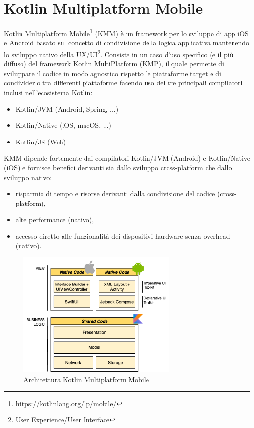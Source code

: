 

\section{Kotlin Multiplatform Mobile}
Kotlin Multiplatform Mobile\footnote{\url{https://kotlinlang.org/lp/mobile/}} (KMM) è un framework per lo sviluppo di app iOS e Android basato sul concetto di condivisione della logica applicativa mantenendo lo sviluppo nativo della UX/UI\footnote{User Experience/User Interface}. Consiste in un caso d'uso specifico (e il più diffuso) del framework Kotlin MultiPlatform (KMP), il quale permette di sviluppare il codice in modo agnostico rispetto le piattaforme target e di condividerlo tra differenti piattaforme facendo uso dei tre principali compilatori inclusi nell'ecosistema Kotlin\cite{nagy2022simplifying}:
\begin{itemize}
    \item Kotlin/JVM (Android, Spring, ...)
    \item Kotlin/Native (iOS, macOS, ...)
    \item Kotlin/JS (Web)
\end{itemize}
KMM dipende fortemente dai compilatori Kotlin/JVM (Android) e Kotlin/Native (iOS) e fornisce benefici derivanti sia dallo sviluppo cross-platform che dallo sviluppo nativo:
\begin{itemize}
    \item risparmio di tempo e risorse derivanti dalla condivisione del codice (cross-platform),
    \item alte performance (nativo),
    \item accesso diretto alle funzionalità dei dispositivi hardware senza overhead (nativo).
\end{itemize}

\begin{figure}[H]
\centering
\includegraphics[width=0.7\textwidth]{img/tesi-8-kmm.drawio.png}
\caption{Architettura Kotlin Multiplatform Mobile}
\label{stackKMM}
\end{figure}

